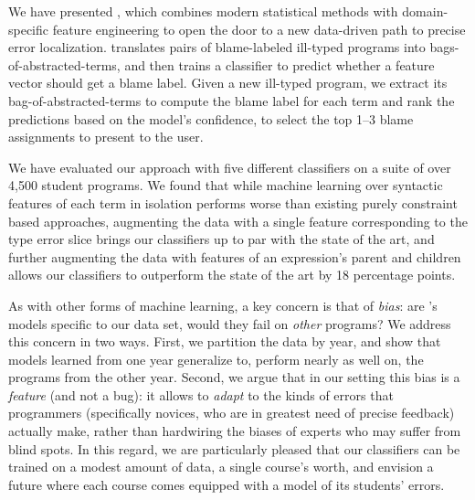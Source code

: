 \label{sec:conclusion}

We have presented \toolname, which
combines modern statistical methods
with domain-specific feature engineering
to open the door to a new data-driven
path to precise error localization.
%
\toolname
translates pairs of
blame-labeled ill-typed
programs into bags-of-abstracted-terms,
and then trains a classifier
to predict whether a feature vector
should get a blame label.
%
Given a new ill-typed program,
we extract its bag-of-abstracted-terms
to compute the blame label for each
term and rank the predictions based
on the model's confidence, to select
the top 1--3 blame assignments to
present to the user.

We have evaluated our approach with
five different classifiers on a suite
of over 4,500 student programs.
%
We found that while machine learning
over syntactic features of each term in isolation
performs worse than existing
purely constraint based approaches, %
augmenting the data with a single feature corresponding to
the type error slice brings our
classifiers up to par with the state of the art,
and further augmenting the data with
features of an expression's parent and children
allows our classifiers to outperform
the state of the art by 18 percentage points.



As with other forms of machine learning,
a key concern is that of \emph{bias}: are
\toolname's models specific
to our data set, would they fail on
\emph{other} programs?
%
We address this concern in two ways.
%
First, we partition the data by year,
and show that models learned from one
year generalize to, \ie perform nearly
as well on, the programs from the other
year.
%
Second, we argue that in our setting
this bias is a \emph{feature} (and not
a bug): it allows \toolname to \emph{adapt}
to the kinds of errors that programmers
(specifically novices, who are in greatest
need of precise feedback) actually make,
rather than hardwiring the biases of
experts who %
may suffer from blind spots. %
%
In this regard, we are particularly pleased
that our classifiers can be trained on a
modest amount of data, \ie a single course's
worth, and envision a future where each course
comes equipped with a model of its students' errors.



